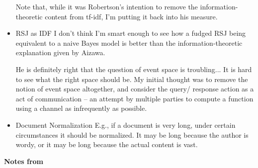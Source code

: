 \documentclass{article}
\newcommand{\hi}[1]{{\large {\bf #1}}}
\begin{document}
\begin{itemize}
    Note that, while it was Robertson's intention to remove the information-theoretic content from tf-idf, I'm putting it back into his measure.

\item RSJ as IDF
    I don't think I'm smart enough to see how a fudged RSJ being equivalent to a naive Bayes model is better than the information-theoretic explanation given by Aizawa.

    He is definitely right that the question of event space is troubling...  It is hard to see what the right space should be.  My initial thought was to remove the notion of event space altogether, and consider the query/ response action as a act of communication -- an attempt by multiple parties to compute a function using a channel as infrequently as possible.

\item Document Normalization
    E.g., if a document is very long, under certain circumstances it should be normalized.  It may be long because the author is wordy, or it may be long because the actual content is vast.

\end{itemize}

\hi{Notes from \cite{razborov-1}}
\end{document}
